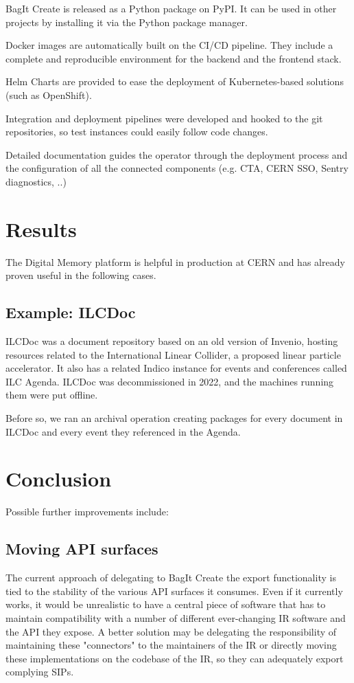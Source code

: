 \documentclass[11pt]{IEEEtran}
\begin{document}
BagIt Create is released as a Python package on PyPI. It can be used in other projects by installing it via the Python package manager.

Docker images are automatically built on the CI/CD pipeline. They include a complete and reproducible environment for the backend and the frontend stack.

Helm Charts are provided to ease the deployment of Kubernetes-based solutions (such as OpenShift).


Integration and deployment pipelines were developed and hooked to the git repositories, so test instances could easily follow code changes.

Detailed documentation guides the operator through the deployment process and the configuration of all the connected components (e.g. CTA, CERN SSO, Sentry diagnostics, ..)


\section{Results}

The Digital Memory platform is helpful in production at CERN and has already proven useful in the following cases.

\subsection{Example: ILCDoc}

ILCDoc was a document repository based on an old version of Invenio, hosting resources related to the International Linear Collider, a proposed linear particle accelerator. It also has a related Indico instance for events and conferences called ILC Agenda.
ILCDoc was decommissioned in 2022, and the machines running them were put offline.

Before so, we ran an archival operation creating packages for every document in ILCDoc and every event they referenced in the Agenda.





\section{Conclusion}

Possible further improvements include:

\subsection{Moving API surfaces}
The current approach of delegating to BagIt Create the export functionality is tied to the stability of the various API surfaces it consumes. Even if it currently works, it would be unrealistic to have a central piece of software that has to maintain compatibility with a number of different ever-changing IR software and the API they expose. A better solution may be delegating the responsibility of maintaining these "connectors" to the maintainers of the IR or directly moving these implementations on the codebase of the IR, so they can adequately export complying SIPs.
\end{document}
